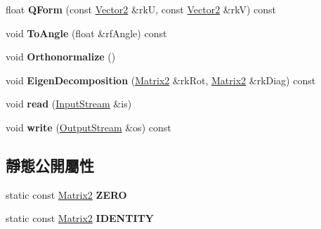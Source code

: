 \begin{DoxyCompactItemize}
\item 
float {\bfseries Q\+Form} (const \hyperlink{class_magnum_1_1_vector2}{Vector2} \&rkU, const \hyperlink{class_magnum_1_1_vector2}{Vector2} \&rkV) const \hypertarget{class_magnum_1_1_matrix2_a1a1bc832bd4196f9f7b4406149ca2929}{}\label{class_magnum_1_1_matrix2_a1a1bc832bd4196f9f7b4406149ca2929}

\item 
void {\bfseries To\+Angle} (float \&rf\+Angle) const \hypertarget{class_magnum_1_1_matrix2_aee37780c75356b8b63f817a99a7efcb1}{}\label{class_magnum_1_1_matrix2_aee37780c75356b8b63f817a99a7efcb1}

\item 
void {\bfseries Orthonormalize} ()\hypertarget{class_magnum_1_1_matrix2_af66b99445e88a06fab385e1a2edc0fc1}{}\label{class_magnum_1_1_matrix2_af66b99445e88a06fab385e1a2edc0fc1}

\item 
void {\bfseries Eigen\+Decomposition} (\hyperlink{class_magnum_1_1_matrix2}{Matrix2} \&rk\+Rot, \hyperlink{class_magnum_1_1_matrix2}{Matrix2} \&rk\+Diag) const \hypertarget{class_magnum_1_1_matrix2_a1f442053159034f2b1674cd407c3f47d}{}\label{class_magnum_1_1_matrix2_a1f442053159034f2b1674cd407c3f47d}

\item 
void {\bfseries read} (\hyperlink{class_magnum_1_1_input_stream}{Input\+Stream} \&is)\hypertarget{class_magnum_1_1_matrix2_acc73bd0814168ec02d6dd3b49ffda1b0}{}\label{class_magnum_1_1_matrix2_acc73bd0814168ec02d6dd3b49ffda1b0}

\item 
void {\bfseries write} (\hyperlink{class_magnum_1_1_output_stream}{Output\+Stream} \&os) const \hypertarget{class_magnum_1_1_matrix2_a0a069de9bc58a04faf02e83d1a516bd0}{}\label{class_magnum_1_1_matrix2_a0a069de9bc58a04faf02e83d1a516bd0}

\end{DoxyCompactItemize}
\subsection*{靜態公開屬性}
\begin{DoxyCompactItemize}
\item 
static const \hyperlink{class_magnum_1_1_matrix2}{Matrix2} {\bfseries Z\+E\+RO}\hypertarget{class_magnum_1_1_matrix2_ac1422e38a1b3ae4c6611a4c1a1c3b1ca}{}\label{class_magnum_1_1_matrix2_ac1422e38a1b3ae4c6611a4c1a1c3b1ca}

\item 
static const \hyperlink{class_magnum_1_1_matrix2}{Matrix2} {\bfseries I\+D\+E\+N\+T\+I\+TY}\hypertarget{class_magnum_1_1_matrix2_a4e3407f5687dae6328e4d41ebe7e7414}{}\label{class_magnum_1_1_matrix2_a4e3407f5687dae6328e4d41ebe7e7414}

\end{DoxyCompactItemize}


